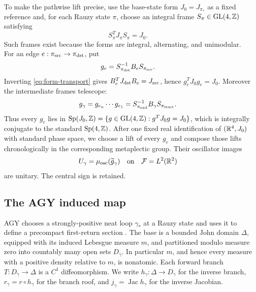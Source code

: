 To make the pathwise lift precise, use the base-state form
\(J_0=J_{\pi_*}\) as a fixed reference and, for each Rauzy state \(\pi\),
choose an integral frame
\(S_\pi\in\operatorname{GL}(4,\mathbb Z)\) satisfying
\[
 S_\pi^T J_\pi S_\pi=J_0.
\]
Such frames exist because the forms are integral, alternating, and
unimodular.
For an edge \(e:\pi_{\rm src}\to\pi_{\rm dst}\), put
\begin{equation}
 g_e=S_{\pi_{\rm dst}}^{-1}B_eS_{\pi_{\rm src}}.
 \label{eq:edge-trivialization}
\end{equation}
Inverting \eqref{eq:form-transport} gives
\(B_e^TJ_{\rm dst}B_e=J_{\rm src}\), hence
\(g_e^TJ_0g_e=J_0\).  Moreover the intermediate frames telescope:
\[
 g_\gamma=g_{e_n}\cdots g_{e_1}
 =S_{\pi_{\rm end}}^{-1}B_\gamma S_{\pi_{\rm start}}.
\]
Thus every \(g_e\) lies in
\(\operatorname{Sp}(J_0,\mathbb Z)=\{g\in\operatorname{GL}(4,\mathbb Z):g^TJ_0g=J_0\}\), which is
integrally conjugate to the standard \(\operatorname{Sp}(4,\mathbb Z)\).  After one fixed real
identification of \((\mathbb R^4,J_0)\) with standard phase space, we
choose a lift of every \(g_e\) and compose those lifts chronologically in
the corresponding metaplectic group.  Their oscillator images
\begin{equation}
 U_\gamma=\mu_{\rm osc}(\widetilde g_\gamma)
 \quad\hbox{on}\quad \mathcal F=L^2(\mathbb R^2)
 \label{eq:fiber-unitary}
\end{equation}
are unitary.  The central sign is retained.

\subsection{The AGY induced map}

AGY chooses a strongly-positive neat loop \(\gamma_*\) at a Rauzy state and
uses it to define a precompact first-return section \citep{agy2006}.  The
base is a bounded John domain \(\Delta\), equipped with its induced
Lebesgue measure \(m\), and partitioned modulo measure zero into countably
many open sets \(D_\gamma\).  In particular \(m\), and hence every measure
with a positive density relative to \(m\), is nonatomic.  Each forward branch
\(T:D_\gamma\to\Delta\) is a \(C^1\) diffeomorphism.  We write
\(h_\gamma:\Delta\to D_\gamma\) for the inverse branch,
\(r_\gamma=r\circ h_\gamma\) for the branch roof, and
\(j_\gamma=\operatorname{Jac}h_\gamma\) for the inverse Jacobian.

